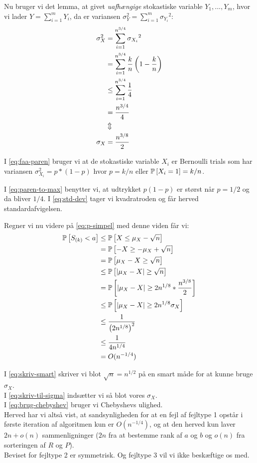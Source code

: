 Nu bruger vi det lemma, at givet \emph{uafhængige} stokastiske variable $Y_1, ..., Y_m$, hvor vi lader $Y = \sum_{i=1}^m Y_i$, da er variansen $\sigma_Y^2 = \sum_{i=1}^m {\sigma_{Y_i}}^2$:
\begin{align}
  \sigma_X^2 &= \sum_{i=1}^{n^{3/4}} {\sigma_{X_i}}^2 \nonumber \\
  &= \sum_{i=1}^{n^{3/4}} \frac{k}{n} \p{ 1 - \frac{k}{n} } \label{eq:faa-paren} \\
  &\leq \sum_{i=1}^{n^{3/4}} \frac{1}{4} \label{eq:paren-to-max} \\
  &= \frac{n^{3/4}}{4} \nonumber \\
  &\Updownarrow \nonumber \\
  \sigma_X &= \frac{n^{3/8}}{2} \label{eq:std-dev}
\end{align}

I \cref{eq:faa-paren} bruger vi at de stokastiske variable $X_i$ er Bernoulli trials som har variansen $\sigma_{X_i}^2= p*(1-p)$ hvor $p = k/n$ eller $\P{X_i = 1} = k/n$.



I \cref{eq:paren-to-max} benytter vi, at udtrykket $p(1 - p)$ er størst når $p = 1/2$ og da bliver $1/4$.
I \cref{eq:std-dev} tager vi kvadratroden og får herved standardafvigelsen.

Regner vi nu videre på \cref{eq:p-simpel} med denne viden får vi:
\begin{align}
  \P{S_{(k)} < a} &\leq \P{X \leq \mu_X - \sqrt{n}} \nonumber \\
  &= \P{-X \geq -\mu_X + \sqrt{n}} \nonumber \\
  &= \P{\mu_X - X \geq \sqrt{n}} \nonumber \\
  &\leq \P{|\mu_X - X| \geq \sqrt{n}}  \nonumber \\
  &= \P{|\mu_X - X| \geq 2n^{1/8} * \frac{n^{3/8}}{2}  } \label{eq:skriv-smart} \\
  &\leq \P{ |\mu_X - X| \geq 2n^{1/8} \sigma_X } \label{eq:skriv-til-sigma} \\
  &\leq \frac{1}{\p{2n^{1/8}}^2} \label{eq:brug-chebyshev} \\
  &\leq \frac{1}{4n^{1/4}} \nonumber \\
  &= O(n^{-1/4}) \nonumber
\end{align}

I \cref{eq:skriv-smart} skriver vi blot $\sqrt{n} = n^{1/2}$ på en smart måde for at kunne bruge $\sigma_X$.\\
I \cref{eq:skriv-til-sigma} indsætter vi så blot vores $\sigma_X$.\\
I \cref{eq:brug-chebyshev} bruger vi Chebyshevs ulighed.\\

Herved har vi altså vist, at sandsynligheden for at en fejl af fejltype 1 opstår i første iteration af algoritmen kun er $O(n^{-1/4})$, og at den herved kun laver $2n + o(n)$ sammenligninger ($2n$ fra at bestemme rank af $a$ og $b$ og $o(n)$ fra sorteringen af $R$ og $P$).\\

Beviset for fejltype 2 er symmetrisk. Og fejltype 3 vil vi ikke beskæftige os med.
